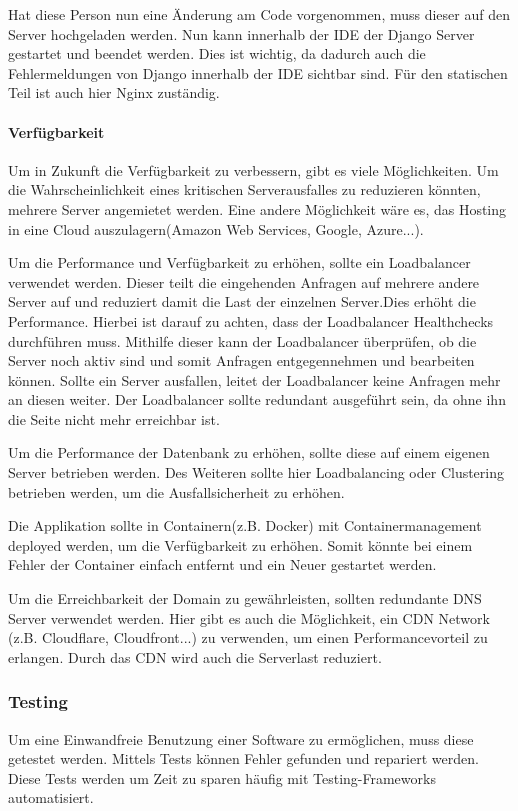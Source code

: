 Hat diese Person nun eine Änderung am Code vorgenommen, muss dieser auf den Server hochgeladen werden. Nun kann innerhalb der IDE der Django Server gestartet und beendet werden. Dies ist wichtig, da dadurch auch die Fehlermeldungen von Django innerhalb der \gls{IDE} sichtbar sind. Für den statischen Teil ist auch hier Nginx zuständig.

\paragraph{Verfügbarkeit}
Um in Zukunft die Verfügbarkeit zu verbessern, gibt es viele Möglichkeiten. Um die Wahrscheinlichkeit eines kritischen Serverausfalles zu reduzieren könnten, mehrere Server angemietet werden. Eine andere Möglichkeit wäre es, das Hosting in eine Cloud auszulagern(Amazon Web Services, Google, Azure...). 

Um die Performance und Verfügbarkeit zu erhöhen, sollte ein Loadbalancer verwendet werden. Dieser teilt die eingehenden Anfragen auf mehrere andere Server auf und reduziert damit die Last der einzelnen Server.Dies erhöht die Performance. Hierbei ist darauf zu achten, dass der Loadbalancer Healthchecks durchführen muss. Mithilfe dieser kann der Loadbalancer überprüfen, ob die Server noch aktiv sind und somit Anfragen entgegennehmen und bearbeiten können. Sollte ein Server ausfallen, leitet der Loadbalancer keine Anfragen mehr an diesen weiter. Der Loadbalancer sollte redundant ausgeführt sein, da ohne ihn die Seite nicht mehr erreichbar ist. 

Um die Performance der Datenbank zu erhöhen, sollte diese auf einem eigenen Server betrieben werden. Des Weiteren sollte hier Loadbalancing oder Clustering betrieben werden, um die Ausfallsicherheit zu erhöhen. 

Die Applikation sollte in Containern(z.B. Docker) mit Containermanagement deployed werden, um die Verfügbarkeit zu erhöhen. Somit könnte bei einem Fehler der Container einfach entfernt und ein Neuer gestartet werden. 

Um die Erreichbarkeit der Domain zu gewährleisten, sollten redundante DNS Server verwendet werden. Hier gibt es auch die Möglichkeit, ein CDN Network (z.B. Cloudflare, Cloudfront...) zu verwenden, um einen Performancevorteil zu erlangen. Durch das CDN wird auch die Serverlast reduziert.

\newpage

\subsubsection{Testing}
Um eine Einwandfreie Benutzung einer Software zu ermöglichen, muss diese getestet werden. Mittels Tests können Fehler gefunden und repariert werden. Diese Tests werden um Zeit zu sparen häufig mit Testing-Frameworks automatisiert.

